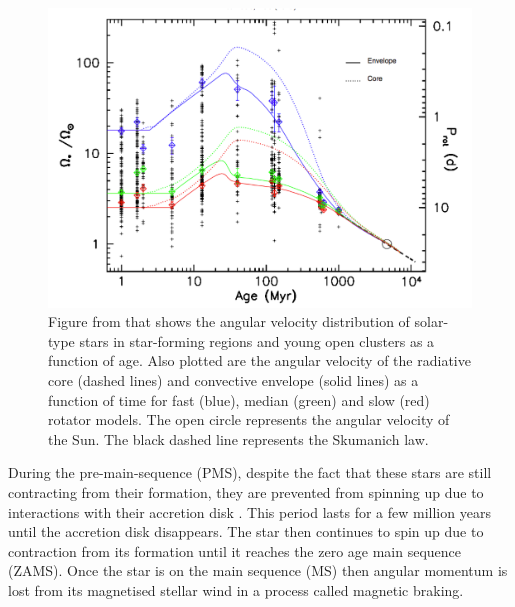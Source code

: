 \begin{figure}[h]
    \centering
    \includegraphics[scale=0.4]{Figures/1-Introduction/gallet&_bouvier_figure_2013.pdf}
    \caption[Angular velocity distribution as a function of age]{Figure from \citet{Gallet_Bouvier_2013} that shows the angular velocity distribution of solar-type stars in star-forming regions and young open clusters as a function of age. Also plotted are the angular velocity of the radiative core (dashed lines) and convective envelope (solid lines) as a function of time for fast (blue), median (green) and slow (red) rotator models. The open circle represents the angular velocity of the Sun. The black dashed line represents the Skumanich law.}
    \label{fig:gallet_&_bouvier_2013_fig}
\end{figure}

During the pre-main-sequence (PMS), despite the fact that these stars are still contracting from their formation, they are prevented from spinning up due to interactions with their accretion disk \citep{Edwards_etal_1993,Rebull_etal_2004}. This period lasts for a few million years until the accretion disk disappears. The star then continues to spin up due to contraction from its formation until it reaches the zero age main sequence (ZAMS). Once the star is on the main sequence (MS) then angular momentum is lost from its magnetised stellar wind in a process called magnetic braking.

